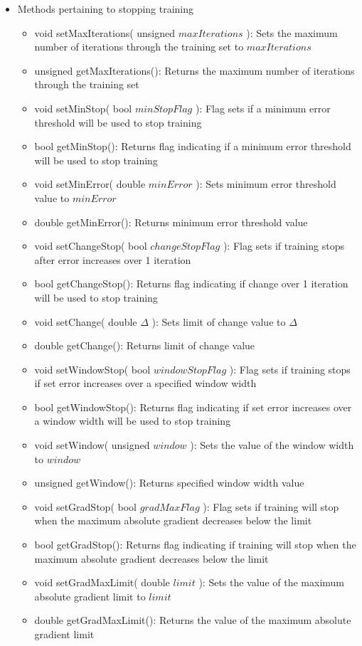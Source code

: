 \documentclass{report}
\begin{document}
\begin{itemize}
\begin{itemize}
\item Methods pertaining to stopping training
\begin{itemize}
\item void setMaxIterations( unsigned $maxIterations$ ): Sets the
      maximum number of iterations through the training set to
      $maxIterations$
\item unsigned getMaxIterations(): Returns the maximum number of
      iterations through the training set
\item void setMinStop( bool $minStopFlag$ ): Flag sets if a minimum
      error threshold will be used to stop training
\item bool getMinStop(): Returns flag indicating if a minimum error
      threshold will be used to stop training
\item void setMinError( double $minError$ ): Sets minimum error
      threshold value to $minError$
\item double getMinError(): Returns minimum error threshold value
\item void setChangeStop( bool $changeStopFlag$ ): Flag sets if
      training stops after error increases over 1 iteration
\item bool getChangeStop(): Returns flag indicating if change over 1
      iteration will be used to stop training
\item void setChange( double $\Delta$ ): Sets limit of change value to
      $\Delta$
\item double getChange(): Returns limit of change value
\item void setWindowStop( bool $windowStopFlag$ ): Flag sets if
      training stops if set error increases over a specified window
      width
\item bool getWindowStop(): Returns flag indicating if set error
      increases over a window width will be used to stop training
\item void setWindow( unsigned $window$ ): Sets the value of the
      window width to $window$
\item unsigned getWindow(): Returns specified window width value

\item void setGradStop( bool $gradMaxFlag$ ): Flag sets if training
      will stop when the maximum absolute gradient decreases below the
      limit
\item bool getGradStop(): Returns flag indicating if training will
      stop when the maximum absolute gradient decreases below the
      limit
\item void setGradMaxLimit( double $limit$ ): Sets the value of the
      maximum absolute gradient limit to $limit$
\item double getGradMaxLimit(): Returns the value of the maximum
      absolute gradient limit


\end{itemize}
\end{itemize}
\end{itemize}
\end{document}
